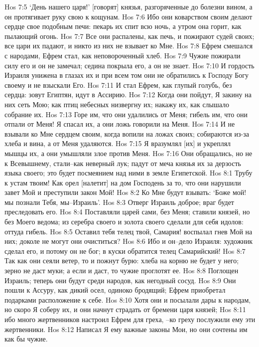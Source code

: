Hos 7:5  `День нашего царя!' [говорят] князья, разгоряченные до болезни вином, а он протягивает руку свою к кощунам.
Hos 7:6  Ибо они коварством своим делают сердце свое подобным печи: пекарь их спит всю ночь, а утром она горит, как пылающий огонь.
Hos 7:7  Все они распалены, как печь, и пожирают судей своих; все цари их падают, и никто из них не взывает ко Мне.
Hos 7:8  Ефрем смешался с народами, Ефрем стал, как неповороченный хлеб.
Hos 7:9  Чужие пожирали силу его и он не замечал; седина покрыла его, а он не знает.
Hos 7:10  И гордость Израиля унижена в глазах их и при всем том они не обратились к Господу Богу своему и не взыскали Его.
Hos 7:11  И стал Ефрем, как глупый голубь, без сердца: зовут Египтян, идут в Ассирию.
Hos 7:12  Когда они пойдут, Я закину на них сеть Мою; как птиц небесных низвергну их; накажу их, как слышало собрание их.
Hos 7:13  Горе им, что они удалились от Меня; гибель им, что они отпали от Меня! Я спасал их, а они ложь говорили на Меня.
Hos 7:14  И не взывали ко Мне сердцем своим, когда вопили на ложах своих; собираются из-за хлеба и вина, а от Меня удаляются.
Hos 7:15  Я вразумлял [их] и укреплял мышцы их, а они умышляли злое против Меня.
Hos 7:16  Они обращались, но не к Всевышнему, стали--как неверный лук; падут от меча князья их за дерзость языка своего; это будет посмеянием над ними в земле Египетской.
Hos 8:1  Трубу к устам твоим! Как орел [налетит] на дом Господень за то, что они нарушили завет Мой и преступили закон Мой!
Hos 8:2  Ко Мне будут взывать: `Боже мой! мы познали Тебя, мы--Израиль'.
Hos 8:3  Отверг Израиль доброе; враг будет преследовать его.
Hos 8:4  Поставляли царей сами, без Меня; ставили князей, но без Моего ведома; из серебра своего и золота своего сделали для себя идолов: оттуда гибель.
Hos 8:5  Оставил тебя телец твой, Самария! воспылал гнев Мой на них; доколе не могут они очиститься?
Hos 8:6  Ибо и он--дело Израиля: художник сделал его, и потому он не бог; в куски обратится телец Самарийский!
Hos 8:7  Так как они сеяли ветер, то и пожнут бурю: хлеба на корню не будет у него; зерно не даст муки; а если и даст, то чужие проглотят ее.
Hos 8:8  Поглощен Израиль; теперь они будут среди народов, как негодный сосуд.
Hos 8:9  Они пошли к Ассуру, как дикий осел, одиноко бродящий; Ефрем приобретал подарками расположение к себе.
Hos 8:10  Хотя они и посылали дары к народам, но скоро Я соберу их, и они начнут страдать от бремени царя князей;
Hos 8:11  ибо много жертвенников настроил Ефрем для греха, --ко греху послужили ему эти жертвенники.
Hos 8:12  Написал Я ему важные законы Мои, но они сочтены им как бы чужие.
